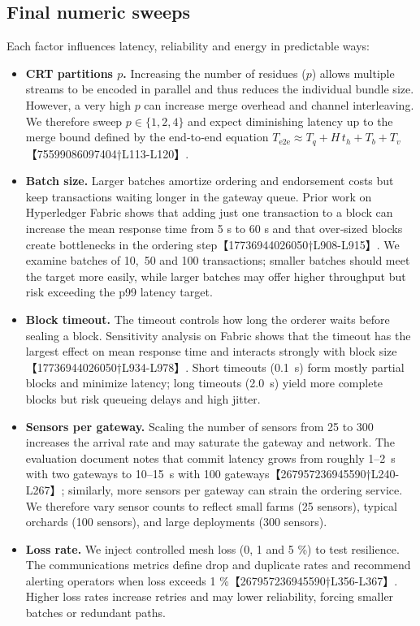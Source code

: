\documentclass[12pt,onecolumn]{IEEEtran} %
\begin{document}
\subsection{Final numeric sweeps}
\label{sec:numeric-sweeps}
Each factor influences latency, reliability and energy in predictable ways:
\begin{itemize}
  \item \textbf{CRT partitions $p$.} Increasing the number of residues ($p$) allows multiple streams to be encoded in parallel and thus reduces the individual bundle size.  However, a very high $p$ can increase merge overhead and channel interleaving.  We therefore sweep $p\in\{1,2,4\}$ and expect diminishing latency up to the merge bound defined by the end‑to‑end equation $T_{\mathrm{e2e}}\approx T_q + H\,t_h + T_b + T_v$【75599086097404†L113-L120】.

  \item \textbf{Batch size.} Larger batches amortize ordering and endorsement costs but keep transactions waiting longer in the gateway queue.  Prior work on Hyperledger Fabric shows that adding just one transaction to a block can increase the mean response time from 5 s to 60 s and that over‑sized blocks create bottlenecks in the ordering step【17736944026050†L908-L915】.  We examine batches of 10,~50 and 100 transactions; smaller batches should meet the \SLOpL{} target more easily, while larger batches may offer higher throughput but risk exceeding the p99 latency target.

  \item \textbf{Block timeout.} The timeout controls how long the orderer waits before sealing a block.  Sensitivity analysis on Fabric shows that the timeout has the largest effect on mean response time and interacts strongly with block size【17736944026050†L934-L978】.  Short timeouts (0.1~s) form mostly partial blocks and minimize latency; long timeouts (2.0~s) yield more complete blocks but risk queueing delays and high jitter.

  \item \textbf{Sensors per gateway.} Scaling the number of sensors from 25 to 300 increases the arrival rate and may saturate the gateway and network.  The evaluation document notes that commit latency grows from roughly 1–2~s with two gateways to 10–15~s with 100 gateways【267957236945590†L240-L267】; similarly, more sensors per gateway can strain the ordering service.  We therefore vary sensor counts to reflect small farms (25 sensors), typical orchards (100 sensors), and large deployments (300 sensors).

  \item \textbf{Loss rate.} We inject controlled mesh loss (0, 1 and 5 \%) to test resilience.  The communications metrics define drop and duplicate rates and recommend alerting operators when loss exceeds 1 \%【267957236945590†L356-L367】.  Higher loss rates increase retries and may lower reliability, forcing smaller batches or redundant paths.
\end{itemize}
\end{document}
